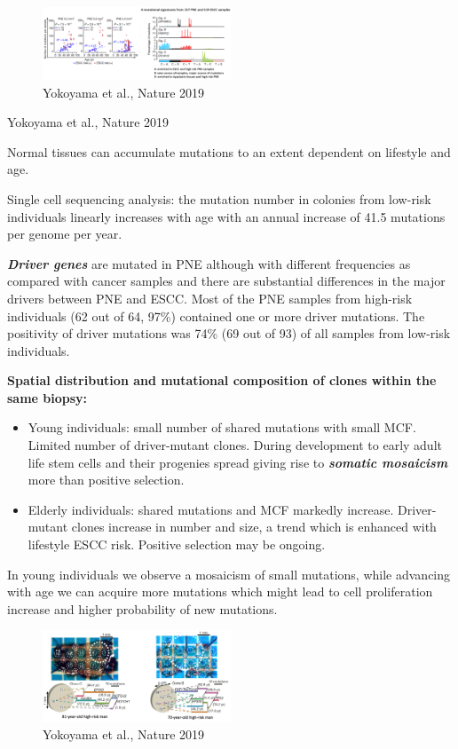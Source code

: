 \begin{figure}
\centering
\includegraphics[width=0.5\textwidth]{../_resources/Screen_Shot_2022-11-04_at_10-51-30.png}
\caption{Yokoyama et al., Nature 2019}
\end{figure}

Yokoyama et al., Nature 2019

Normal tissues can accumulate mutations to an extent dependent on lifestyle and age.

Single cell sequencing analysis: the mutation number in colonies from low-risk individuals linearly increases with age with an annual increase of 41.5 mutations per genome per year.

\textbf{\emph{Driver genes}} are mutated in PNE although with different frequencies as compared with
cancer samples and there are substantial differences in the major drivers between PNE and ESCC. Most of the PNE samples from high-risk individuals (62 out of 64, 97\%) contained one or more driver mutations. The positivity of driver mutations was 74\% (69 out of 93) of all samples from low-risk individuals.

\textbf{Spatial distribution and mutational composition of clones within the same biopsy:}

\begin{itemize}
\tightlist
\item
  Young individuals: small number of shared mutations with small MCF. Limited number of driver-mutant clones. During development to early adult life stem cells and their progenies spread giving rise to \textbf{\emph{somatic mosaicism}} more than positive selection.
\item
  Elderly individuals: shared mutations and MCF markedly increase. Driver-mutant clones increase in number and size, a trend which is enhanced with lifestyle ESCC risk. Positive selection may be ongoing.
\end{itemize}

In young individuals we observe a mosaicism of small mutations, while advancing with age we can acquire more mutations which might lead to cell proliferation increase and higher probability of new mutations.

\begin{figure}
\centering
\includegraphics[width=0.5\textwidth]{../_resources/Screen_Shot_2022-11-04_at_10-59-51.png}
\caption{Yokoyama et al., Nature 2019}
\end{figure}

